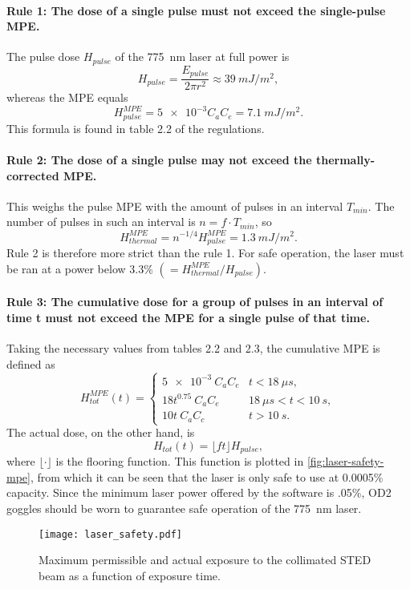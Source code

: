 \paragraph{Rule 1: The dose of a single pulse must not exceed the single-pulse MPE.} The pulse dose $ H_\mathit{pulse} $ of the 775~nm laser at full power is
\begin{equation}
	H_\mathit{pulse} = \frac{E_\mathit{pulse}}{2\pi r^2} \approx \SI{39}{mJ/m^2},
\end{equation}
whereas the MPE equals
\begin{equation}
	H_\mathit{pulse}^\mathit{MPE} = \num{5e-3} C_a C_e = \SI{7.1}{mJ/m^2}.
\end{equation}
This formula is found in table 2.2 of the regulations.

\paragraph{Rule 2: The dose of a single pulse may not exceed the thermally-corrected MPE.} This weighs the pulse MPE with the amount of pulses in an interval $ T_\mathit{min} $. The number of pulses in such an interval is $ n = f\cdot T_\mathit{min} $, so
\begin{equation}
	H_\mathit{thermal}^\mathit{MPE} =  n^{-1/4} H_\mathit{pulse}^\mathit{MPE} = \SI{1.3}{mJ/m^2}.
\end{equation}
Rule 2 is therefore more strict than the rule 1. For safe operation, the laser must be ran at a power below 3.3\% $ (=H^\mathit{MPE}_\mathit{thermal} / H_\mathit{pulse}) $.

\paragraph{Rule 3: The cumulative dose for a group of pulses in an interval of time t must not exceed the MPE for a single pulse of that time.} Taking the necessary values from tables 2.2 and 2.3, the cumulative MPE is defined as
\begin{equation}
	H_\mathit{tot}^\mathit{MPE}(t) = \left\{\begin{array}{rl}
		\num{5e-3} \:C_a C_e &  t<\SI{18}{\mu s,} \\
		18 t^{0.75} \:C_a C_e &  \SI{18}{\mu s} < t < \SI{10}{s}, \\
		10 t\:C_a C_c  &t> \SI{10}{s}.
	\end{array}\right.
\end{equation}
The actual dose, on the other hand, is
\begin{equation}
	H_\mathit{tot}(t) = \lfloor ft \rfloor H_\mathit{pulse},
\end{equation}
where $ \lfloor \cdot \rfloor$ is the flooring function. This function is plotted in \autoref{fig:laser-safety-mpe}, from which it can be seen that the laser is only safe to use at 0.0005\% capacity. Since the minimum laser power offered by the software is .05\%, OD2 goggles should be worn to guarantee safe operation of the 775~nm laser.

\begin{figure}
	\centering
	\texttt{[image: laser\_safety.pdf]}
	\caption{Maximum permissible  and actual exposure to the collimated STED beam as a function of exposure time.}
	\label{fig:laser-safety-mpe}
\end{figure}